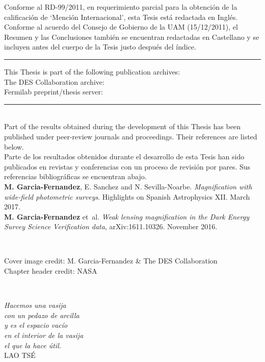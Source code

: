 \documentclass[12pt]{book} %
\begin{document}
\noindent
Conforme al RD-99/2011, en requerimiento parcial para la obtenci\'on de la calificaci\'on  de `Menci\'on Internacional', esta Tesis est\'a redactada en Ingl\'es.\\
Conforme al acuerdo del Consejo de Gobierno de la UAM (15/12/2011), el Resumen y las Conclusiones tambi\'en se encuentran redactadas en Castellano y se incluyen antes del cuerpo de la Tesis justo despu\'es del \'indice.
\vspace*{2cm}
\begin{flushleft}
\rule{\textwidth}{2pt}
This Thesis is part of the following publication archives:\\
The DES Collaboration archive:\\
Fermilab preprint/thesis server:\\
\rule{\textwidth}{2pt}\\
\vspace*{2cm}
\noindent
Part of the results obtained during the development of this Thesis has been published under peer-review journals and proceedings. Their references are listed below.\\

\noindent
Parte de los resultados obtenidos durante el desarrollo de esta Tesis han sido publicados en revistas y conferencias con un proceso de revisi\'on por pares. Sus referencias bibliogr\'aficas se encuentran abajo.\\
\vspace*{0.5cm}
{\bf M. Garcia-Fernandez}, E. Sanchez and N. Sevilla-Noarbe. {\it Magnification with wide-field photometric surveys}. Highlights on Spanish Astrophysics XII. March 2017.\\
\vspace*{0.5cm}
{\bf M. Garcia-Fernandez} et~al. {\it Weak lensing magnification in the Dark Energy Survey Science Verification data}, arXiv:1611.10326. November 2016.

~\vfill
\thispagestyle{empty}
\begin{footnotesize}
Cover image credit: M. Garcia-Fernandez \& The DES Collaboration\\
Chapter header credit: NASA
\end{footnotesize}
\end{flushleft}

\newpage
~\vfill
\thispagestyle{empty}


\newpage
\thispagestyle{empty}
\begin{flushright}
\begin{large}
\vspace*{3cm}
{\it Hacemos una vasija\\ con un pedazo de arcilla\\ y es el espacio vac\'io\\ en el interior de la vasija\\ el que la hace \'util.}\\
\vspace{1cm}
LAO TS\'E\\
\end{large}
~\vfill
\end{flushright}
\end{document}
